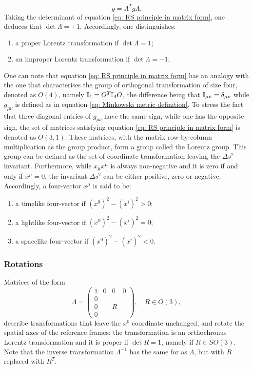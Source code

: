 \begin{equation}
\label{eq: RS principle in matrix form}
    g = \Lambda^Tg\Lambda.
\end{equation}
Taking the determinant of equation \eqref{eq: RS principle in matrix form}, one deduces that $\det{\Lambda} = \pm1$. Accordingly, one distinguishes:
\begin{enumerate}
    \item a proper Lorentz transformation if $\det{\Lambda} = 1$;
    \item an improper Lorentz transformation if $\det{\Lambda} = -1$;
\end{enumerate}
One can note that equation \eqref{eq: RS principle in matrix form} has an analogy with the one that characterises the group of orthogonal transformation of size four, denoted as $O(4)$, namely $\mathbb{I}_4 = O^T\mathbb{I}_4O$, the difference being that $\mathbb{I}_{\mu\nu} = \delta_{\mu\nu}$ while $g_{\mu\nu}$ is defined as in equation \eqref{eq: Minkowski metric definition}. To stress the fact that three diagonal entries of $g_{\mu\nu}$ have the same sign, while one has the opposite sign, the set of matrices satisfying equation \eqref{eq: RS principle in matrix form} is denoted as $O(3,1)$. These matrices, with the matrix row-by-column multiplication as the group product, form a group called the Lorentz group. This group can be defined as the set of coordinate transformation leaving the $\Delta s^2$ invariant. Furthermore, while $x_\mu x^\mu$ is always non-negative and it is zero if and only if $x^\mu = 0$, the invariant $\Delta s^2$ can be either positive, zero or negative. Accordingly, a four-vector $x^\mu$ is said to be:
\begin{enumerate}
    \item a timelike four-vector if $(x^0)^2 - (x^i)^2 > 0$;
    \item a lightlike four-vector if $(x^0)^2 - (x^i)^2 = 0$;
    \item a spacelike four-vector if $(x^0)^2 - (x^i)^2 < 0$.
\end{enumerate}

\subsubsection{Rotations}
Matrices of the form 
\begin{equation}
\label{eq: general Lorentz rotation}
    \Lambda = 
    \begin{pmatrix}
        1 & 0 & 0 & 0 \\
        0 & & & \\
        0 & & R & \\
        0 & & &
    \end{pmatrix},\quad R \in O(3),
\end{equation}
describe transformations that leave the $x^0$ coordinate unchanged, and rotate the spatial axes of the reference frames; the transformation is an orthochronus Lorentz transformation and it is proper if $\det{R} = 1$, namely if $R \in SO(3)$. Note that the inverse transformation $\Lambda^{-1}$ has the same for as $\Lambda$, but with $R$ replaced with $R^T$. 

